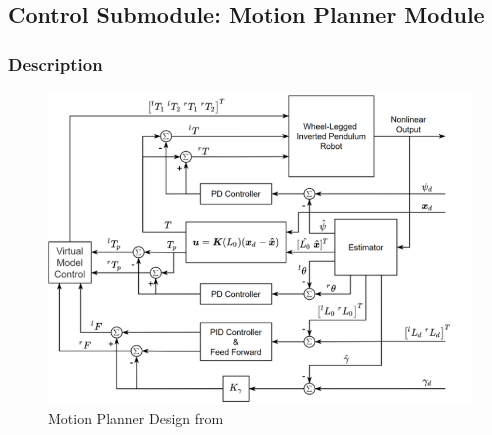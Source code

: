 \documentclass[12pt]{article}
\begin{document}
    \subsection{Control Submodule: Motion Planner Module}
        \subsubsection{Description}      
            \begin{figure}[H]
                \centering
                \includegraphics[width=\textwidth,height=\textheight,keepaspectratio]{../Motion Planner Design.png}
                \caption{Motion Planner Design from \citet{HarbinEngCtrlDesign2022}}
                \label{fig:Motion Planner Design}
            \end{figure}
\end{document}
